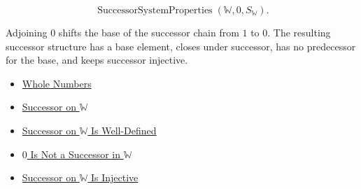 \begin{remark*}
\[
\operatorname{SuccessorSystemProperties}(\mathbb{W},0,S_{\mathbb{W}}).
\]
\end{remark*}

\begin{remark*}[Interpretation]
Adjoining $0$ shifts the base of the successor chain from $1$ to $0$. The
resulting successor structure has a base element, closes under successor, has
no predecessor for the base, and keeps successor injective.
\end{remark*}

\begin{dependencies}
\begin{itemize}
  \item \hyperref[def:whole-numbers]{Whole Numbers}
  \item \hyperref[def:successor-on-w]{Successor on $\mathbb{W}$}
  \item \hyperref[thm:successor-on-w-well-defined]{Successor on $\mathbb{W}$ Is Well-Defined}
  \item \hyperref[thm:zero-is-not-successor-in-w]{$0$ Is Not a Successor in $\mathbb{W}$}
  \item \hyperref[thm:successor-on-w-injective]{Successor on $\mathbb{W}$ Is Injective}
\end{itemize}
\end{dependencies}
